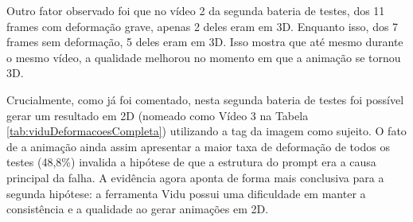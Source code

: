 Outro fator observado foi que no vídeo 2 da segunda bateria de testes, dos 11 frames com deformação grave, apenas 2 deles eram em 3D. Enquanto isso, dos 7 frames sem deformação, 5 deles eram em 3D. Isso mostra que até mesmo durante o mesmo vídeo, a qualidade melhorou no momento em que a animação se tornou 3D.

Crucialmente, como já foi comentado, nesta segunda bateria de testes foi possível gerar um resultado em 2D (nomeado como Vídeo 3 na Tabela \ref{tab:viduDeformacoesCompleta}) utilizando a tag da imagem como sujeito. O fato de a animação ainda assim apresentar a maior taxa de deformação de todos os testes (48,8\%) invalida a hipótese de que a estrutura do prompt era a causa principal da falha. A evidência agora aponta de forma mais conclusiva para a segunda hipótese: a ferramenta Vidu possui uma dificuldade em manter a consistência e a qualidade ao gerar animações em 2D.